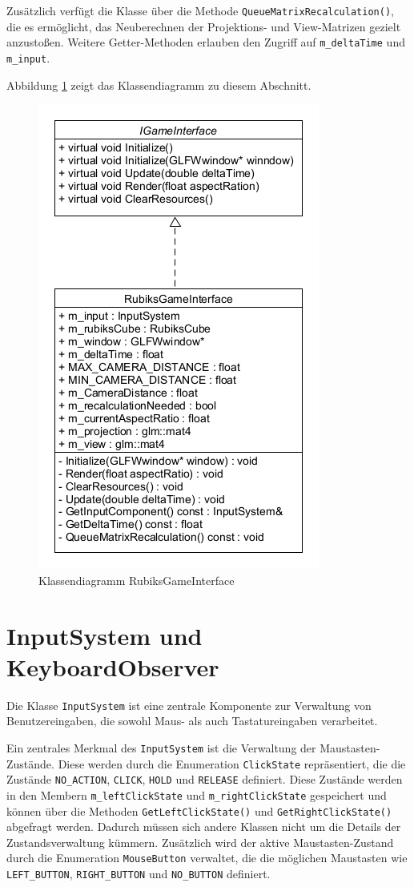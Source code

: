 Zusätzlich verfügt die Klasse über die Methode \texttt{QueueMatrixRecalculation()}, die es ermöglicht, das Neuberechnen der Projektions- und View-Matrizen gezielt anzustoßen.
Weitere Getter-Methoden erlauben den Zugriff auf \texttt{m\_deltaTime} und \texttt{m\_input}. 

Abbildung \ref{RubiksGameInterfaceDia} zeigt das Klassendiagramm zu diesem Abschnitt.

\begin{figure} [H]
	\centering
	\includegraphics[scale=0.6]{images/GameInterfaceClassDia.png}
	\caption{Klassendiagramm RubiksGameInterface}
	\label{RubiksGameInterfaceDia}
\end{figure}

\section{InputSystem und KeyboardObserver}
Die Klasse \texttt{InputSystem} ist eine zentrale Komponente zur Verwaltung von Benutzereingaben, die sowohl Maus- als auch Tastatureingaben verarbeitet.

Ein zentrales Merkmal des \texttt{InputSystem} ist die Verwaltung der Maustasten-Zustände. Diese werden durch die Enumeration \texttt{ClickState} repräsentiert, die die Zustände \texttt{NO\_ACTION}, \texttt{CLICK}, \texttt{HOLD} und \texttt{RELEASE} definiert. Diese Zustände werden in den Membern \texttt{m\_leftClickState} und \texttt{m\_rightClickState} gespeichert und können über die Methoden \texttt{GetLeftClickState()} und \texttt{GetRightClickState()} abgefragt werden. Dadurch müssen sich andere Klassen nicht um die Details der Zustandsverwaltung kümmern. Zusätzlich wird der aktive Maustasten-Zustand durch die Enumeration \texttt{MouseButton} verwaltet, die die möglichen Maustasten wie \texttt{LEFT\_BUTTON}, \texttt{RIGHT\_BUTTON} und \texttt{NO\_BUTTON} definiert.

